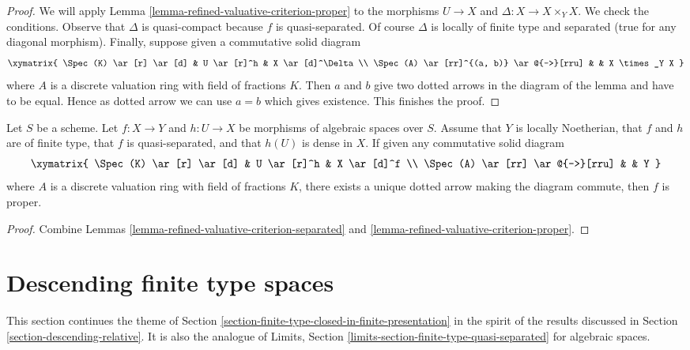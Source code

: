 \begin{proof}
We will apply Lemma \ref{lemma-refined-valuative-criterion-proper}
to the morphisms $U \to X$ and $\Delta : X \to X \times_Y X$.
We check the conditions. Observe that $\Delta$ is quasi-compact because
$f$ is quasi-separated. Of course $\Delta$ is locally of finite type and
separated (true for any diagonal morphism).
Finally, suppose given a commutative solid diagram
$$
\xymatrix{
\Spec(K) \ar[r] \ar[d] & U \ar[r]^h & X \ar[d]^\Delta \\
\Spec(A) \ar[rr]^{(a, b)} \ar@{-->}[rru] & & X \times_Y X
}
$$
where $A$ is a discrete valuation ring with field of fractions $K$.
Then $a$ and $b$ give two dotted arrows in the diagram of the lemma
and have to be equal. Hence as dotted arrow we can use $a = b$
which gives existence. This finishes the proof.
\end{proof}

\begin{lemma}
\label{lemma-refined-valuative-criterion-universally-closed}
Let $S$ be a scheme.
Let $f : X \to Y$ and $h : U \to X$ be morphisms of algebraic spaces over $S$.
Assume that $Y$ is locally Noetherian, that $f$ and $h$ are of finite type,
that $f$ is quasi-separated, and
that $h(U)$ is dense in $X$. If given any commutative solid diagram
$$
\xymatrix{
\Spec(K) \ar[r] \ar[d] & U \ar[r]^h & X \ar[d]^f \\
\Spec(A) \ar[rr] \ar@{-->}[rru] & & Y
}
$$
where $A$ is a discrete valuation ring with field of fractions $K$, there
exists a unique dotted arrow making the diagram commute, then $f$ is proper.
\end{lemma}

\begin{proof}
Combine Lemmas \ref{lemma-refined-valuative-criterion-separated} and
\ref{lemma-refined-valuative-criterion-proper}.
\end{proof}







\section{Descending finite type spaces}
\label{section-finite-type-quasi-separated}

\noindent
This section continues the theme of
Section \ref{section-finite-type-closed-in-finite-presentation}
in the spirit of the results discussed in
Section \ref{section-descending-relative}.
It is also the analogue of
Limits, Section \ref{limits-section-finite-type-quasi-separated}
for algebraic spaces.

